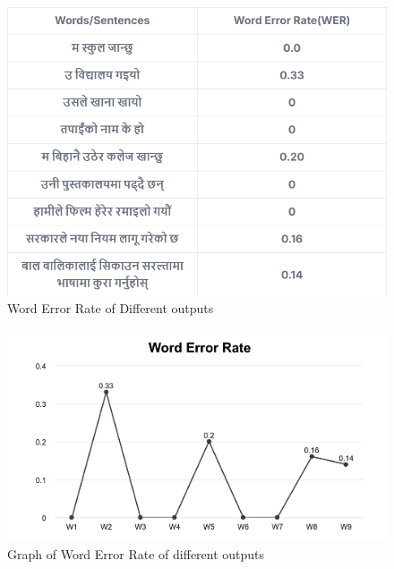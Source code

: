 

\begin{figure}[H]  %
    \centering
    \includegraphics[width=\textwidth]{Images/error.png}
    \caption{Word Error Rate of Different outputs}
    \label{fig:ref_vs_hyp}
\end{figure}


\begin{figure}[H]  %
    \centering
    \includegraphics[width=\textwidth]{Images/graph.png}
    \caption{Graph of Word Error Rate of different outputs}
    \label{fig:ref_vs_hyp}
\end{figure}









 

